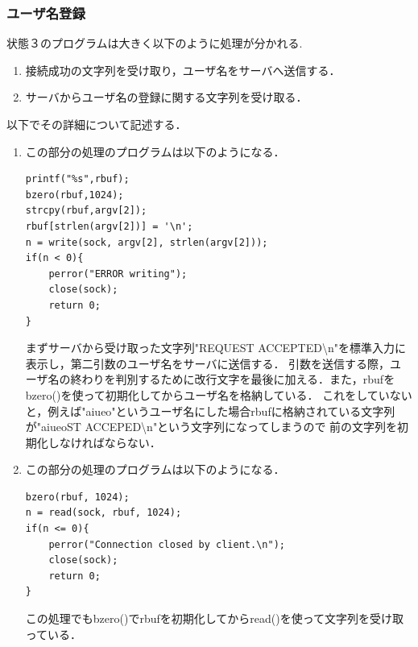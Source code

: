 \documentclass[dvipdfmx]{jarticle}
\begin{document}
\subsubsection{ユーザ名登録}
状態３のプログラムは大きく以下のように処理が分かれる.
\begin{enumerate}
    \item 接続成功の文字列を受け取り，ユーザ名をサーバへ送信する．
    \item サーバからユーザ名の登録に関する文字列を受け取る．
\end{enumerate}
以下でその詳細について記述する．
\begin{enumerate}
    \item この部分の処理のプログラムは以下のようになる．
    \begin{lstlisting}
printf("%s",rbuf);
bzero(rbuf,1024);
strcpy(rbuf,argv[2]);
rbuf[strlen(argv[2])] = '\n';
n = write(sock, argv[2], strlen(argv[2]));
if(n < 0){
    perror("ERROR writing");
    close(sock);
    return 0;
}
    \end{lstlisting}
    まずサーバから受け取った文字列"REQUEST ACCEPTED\textbackslash n"を標準入力に表示し，第二引数のユーザ名をサーバに送信する．
    引数を送信する際，ユーザ名の終わりを判別するために改行文字を最後に加える．また，rbufをbzero()を使って初期化してからユーザ名を格納している．
    これをしていないと，例えば"aiueo"というユーザ名にした場合rbufに格納されている文字列が"aiueoST ACCEPED\textbackslash n"という文字列になってしまうので
    前の文字列を初期化しなければならない．
    \item この部分の処理のプログラムは以下のようになる．
    \begin{lstlisting}
bzero(rbuf, 1024);
n = read(sock, rbuf, 1024);
if(n <= 0){
    perror("Connection closed by client.\n");
    close(sock);
    return 0;
}  
    \end{lstlisting}
    この処理でもbzero()でrbufを初期化してからread()を使って文字列を受け取っている．
\end{enumerate}
\end{document}
